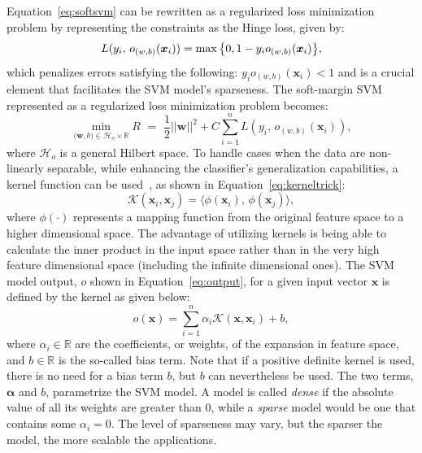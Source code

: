 \documentclass[reqno]{vcuthesis}
\newcommand{\set}[1]{{\left\{#1\right\}}}
\newcommand{\reals}{{\mathbb{R}}}
\newcommand{\spa}[1]{\mathcal{#1}}
\numberwithin{equation}{chapter}
\begin{document}
Equation~\ref{eq:softsvm} can be rewritten as a regularized loss minimization problem by representing the constraints as the Hinge loss, given by:
\begin{equation}\label{eqn:hingeloss}
\centering
L(y_i,\, o_{(w,b)}(\bm{x}_i)) = \max \set{0, 1 - y_i o_{(w,b)}(\bm{x}_i)},
\end{equation}
which penalizes errors satisfying the following: $ y_i o_{(w,b)}(\bm{x}_i) < 1$ and is a crucial element that facilitates the SVM model's sparseness. The soft-margin SVM represented as a regularized loss minimization problem becomes:
\begin{equation}
\label{eqn:reghingeloss}
\min\limits_{\bm (\bm{w},b) \in \mathcal{H}_o \times \reals} R {\,\,} = {\,\,} \frac{1}{2}||\bm{w}||^2 + C\sum_{i=1}^n L(y_i,\, o_{(w,b)}(\bm{x}_i)),
\end{equation}
where $\mathcal{H}_o$ is a general Hilbert space. To handle cases when the data are non-linearly separable, while enhancing the classifier's generalization capabilities, a kernel function can be used~\cite{Aizerman67theoretical}, as shown in Equation~\ref{eq:kerneltrick}:
\begin{equation}
\spa{K}\left(\bm{x}_i,\bm{x}_j\right) = \langle \phi\left(\bm{x}_i\right),\,\phi\left(\bm{x}_j\right)\rangle,
\label{eq:kerneltrick}
\end{equation}
where $\phi(\cdot)$ represents a mapping function from the original feature space to a higher dimensional space. The advantage of utilizing kernels is being able to calculate the inner product in the input space rather than in the very high feature dimensional space (including the infinite dimensional ones). The SVM model output, $o$ shown in Equation~\ref{eq:output}, for a given input vector $\bm{x}$ is defined by the kernel as given below:
\begin{equation}
o(\bm x) = \sum_{i = 1}^n \alpha_i \mathcal{K}(\bm x, \bm{x}_i) + b,
\label{eq:output}
\end{equation}
where $\alpha_i \in \reals$ are the coefficients, or weights, of the expansion in feature space, and $b \in \reals$ is the so-called bias term. Note that if a positive definite kernel is used, there is no need for a bias term $b$, but $b$ can nevertheless be used. The two terms, $\bm \alpha$ and $b$, parametrize the SVM model. A model is called \textit{dense} if the absolute value of all its weights are greater than $0$, while a \textit{sparse} model would be one that contains some $\alpha_i = 0$. The level of sparseness may vary, but the sparser the model, the more scalable the applications.
\end{document}
